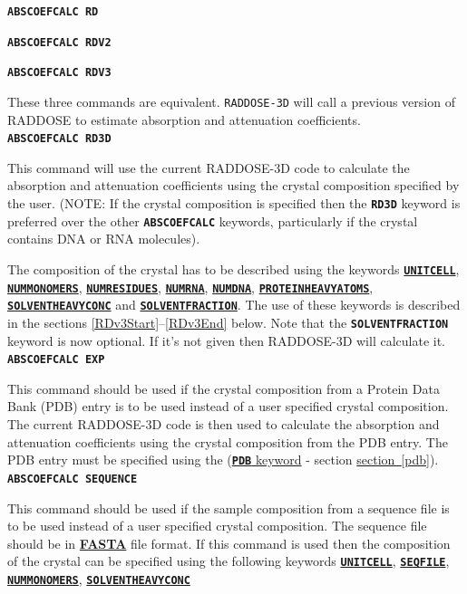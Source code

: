 \documentclass[a4paper]{article}
\newcommand{\RD}{\texttt{RADDOSE-3D}\xspace}
\newcommand{\Keyword}[1]{\texttt{\textbf{#1}}\xspace}
\newcommand{\SB}{\\[0.2em]}
\begin{document}
\noindent \Keyword{ABSCOEFCALC RD}

\noindent \Keyword{ABSCOEFCALC RDV2}

\noindent \Keyword{ABSCOEFCALC RDV3}

These three commands are equivalent. \RD will call a previous version of RADDOSE to estimate absorption and attenuation coefficients.\SB

\noindent \Keyword{ABSCOEFCALC RD3D}

This command will use the current RADDOSE-3D code to calculate the absorption and attenuation coefficients using the crystal composition specified by the user. (NOTE: If the crystal composition is specified then the \Keyword{RD3D} keyword is preferred over the other \Keyword{ABSCOEFCALC} keywords, particularly if the crystal contains DNA or RNA molecules).


The composition of the crystal has to be described using the keywords
 \hyperref[unitcell]{\Keyword{UNITCELL}},
 \hyperref[nummonomers]{\Keyword{NUMMONOMERS}},
 \hyperref[numresidues]{\Keyword{NUMRESIDUES}},
 \hyperref[numrna]{\Keyword{NUMRNA}},
 \hyperref[numdna]{\Keyword{NUMDNA}},
 \hyperref[proteinheavyatoms]{\Keyword{PROTEINHEAVYATOMS}},
 \hyperref[solventheavyconc]{\Keyword{SOLVENTHEAVYCONC}} and
 \hyperref[solventfraction]{\Keyword{SOLVENTFRACTION}}.
The use of these keywords is described in the sections \ref{RDv3Start}--\ref{RDv3End} below. Note that the \Keyword{SOLVENTFRACTION} keyword is now optional. If it's not given then RADDOSE-3D will calculate it.\SB

\noindent \Keyword{ABSCOEFCALC EXP}

This command should be used if the crystal composition from a Protein Data Bank (PDB) entry is to be used instead of a user specified crystal composition. The current RADDOSE-3D code is then used to calculate the absorption and attenuation coefficients using the crystal composition from the PDB entry. The PDB entry must be specified using the (\hyperref[pdb]{\Keyword{PDB} keyword} - section \hyperref[pdb]{section~\ref*{pdb}}).\SB

\noindent \Keyword{ABSCOEFCALC SEQUENCE}

This command should be used if the sample composition from a sequence file is to be used instead of a user specified crystal composition. The sequence file should be in \href{https://en.wikipedia.org/wiki/FASTA_format}{\textbf{FASTA}} file format. If this command is used then the composition of the crystal can be specified using the following keywords
\hyperref[unitcell]{\Keyword{UNITCELL}},
\hyperref[seqfile]{\Keyword{SEQFILE}},
\hyperref[nummonomers]{\Keyword{NUMMONOMERS}},
\hyperref[solventheavyconc]{\Keyword{SOLVENTHEAVYCONC}}
\SB
\end{document}
